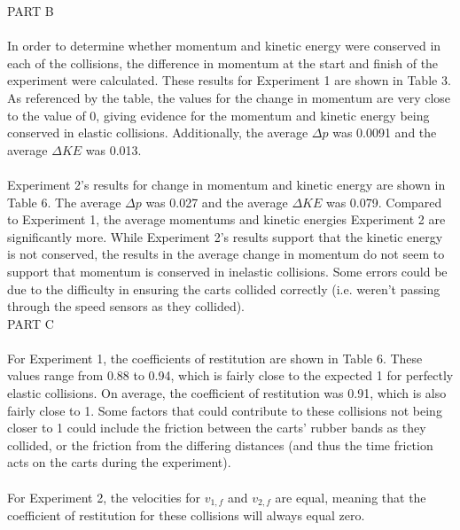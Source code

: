 \documentclass [12pt, letterpaper, twoside] {article}
\begin{document}
\noindent
PART B \\\\
In order to determine whether momentum and kinetic energy were conserved in each of the collisions, the difference in momentum at the start and finish of the experiment were calculated. These results for Experiment 1 are shown in Table 3. As referenced by the table, the values for the change in momentum are very close to the value of 0, giving evidence for the momentum and kinetic energy being conserved in elastic collisions. Additionally, the average \(\Delta{p}\) was 0.0091 and the average \(\Delta{KE}\) was 0.013. \\\\ %
Experiment 2's results for change in momentum and kinetic energy are shown in Table 6. The average \(\Delta{p}\) was 0.027 and the average \(\Delta{KE}\) was 0.079. Compared to Experiment 1, the average momentums and kinetic energies Experiment 2 are significantly more. While Experiment 2's results support that the kinetic energy is not conserved, the results in the average change in momentum do not seem to support that momentum is conserved in inelastic collisions. Some errors could be due to the difficulty in ensuring the carts collided correctly (i.e. weren't passing through the speed sensors as they collided). \\ %

\noindent
PART C \\\\
For Experiment 1, the coefficients of restitution are shown in Table 6. These values range from 0.88 to 0.94, which is fairly close to the expected 1 for perfectly elastic collisions. On average, the coefficient of restitution was 0.91, which is also fairly close to 1. Some factors that could contribute to these collisions not being closer to 1 could include the friction between the carts' rubber bands as they collided, or the friction from the differing distances (and thus the time friction acts on the carts during the experiment). \\\\ %
For Experiment 2, the velocities for \(v_{1,f}\) and \(v_{2,f}\) are equal, meaning that the coefficient of restitution for these collisions will always equal zero. 
\end{document}
